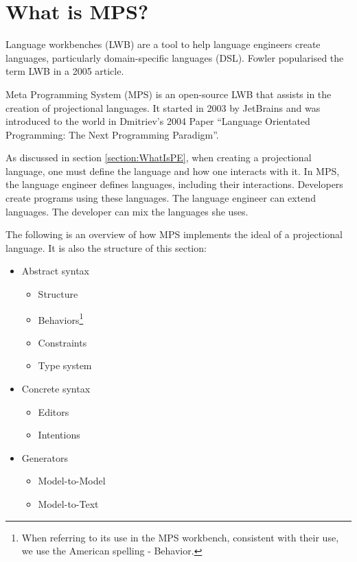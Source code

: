 \section{What is MPS?}
\label{section:MPS}

Language workbenches (LWB) are a tool to help language engineers create languages, particularly domain-specific languages (DSL).
Fowler\cite{Fowler_lwb} popularised the term LWB in a 2005 article.

Meta Programming System (MPS) is an open-source LWB that assists in the creation of projectional languages.
It started in 2003 by JetBrains and was introduced to the world in Dmitriev's 2004 Paper ``Language Orientated Programming: The Next Programming Paradigm''\cite{dmitriev2004language}.

As discussed in section \ref{section:WhatIsPE}, when creating a projectional language, one must define the language and how one interacts with it.
In MPS, the language engineer defines languages, including their interactions.
Developers create programs using these languages.
The language engineer can extend languages.
The developer can mix the languages she uses.

The following is an overview of how MPS implements the ideal of a projectional language.
It is also the structure of this section: 

\begin{itemize}
    \setlength\itemsep{0em}
    \item Abstract syntax
    \begin{itemize}
        \setlength\itemsep{0em}
        \item Structure
        \item Behaviors\footnote{When referring to its use in the MPS workbench, consistent with their use, we use the American spelling - Behavior.}
        \item Constraints
        \item Type system
    \end{itemize}
    \item Concrete syntax
    \begin{itemize}
        \setlength\itemsep{0em}
        \item Editors
        \item Intentions
    \end{itemize}
    \item Generators
    \begin{itemize}
        \setlength\itemsep{0em}
        \item Model-to-Model
        \item Model-to-Text
    \end{itemize}
\end{itemize}

